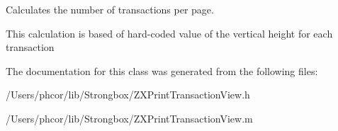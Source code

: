Calculates the number of transactions per page. 

This calculation is based of hard-coded value of the vertical height for each transaction 

The documentation for this class was generated from the following files:\begin{CompactItemize}
\item 
/Users/phcor/lib/Strongbox/ZXPrintTransactionView.h\item 
/Users/phcor/lib/Strongbox/ZXPrintTransactionView.m\end{CompactItemize}
